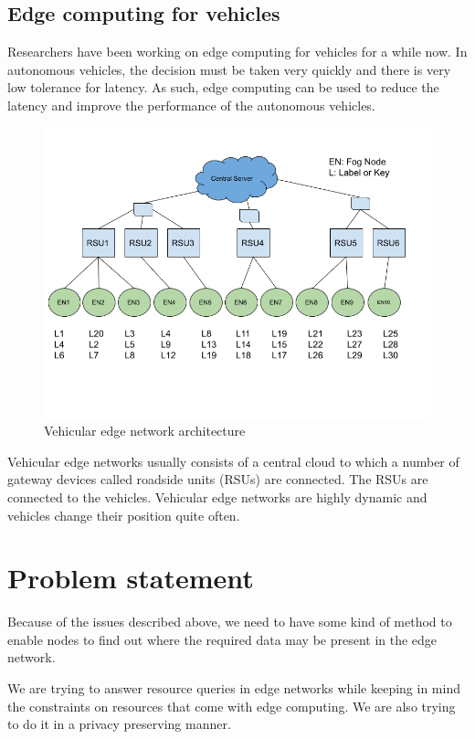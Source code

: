 \subsection{Edge computing for vehicles}

Researchers have been working on edge computing for vehicles for a while now. In
autonomous vehicles, the decision must be taken very quickly and there is very
low tolerance for latency. As such, edge computing can be used to reduce the
latency and improve the performance of the autonomous vehicles.

\begin{figure}[h]
      \centering
      \includegraphics[width=1.0\textwidth]{"Vehicular Edge Network.png"}
      \caption{Vehicular edge network architecture}
\end{figure}

Vehicular edge networks usually consists of a central cloud to which a number of
gateway devices called roadside units (RSUs) are connected. The RSUs are
connected to the vehicles. Vehicular edge networks are highly dynamic and
vehicles change their position quite often.


\section{Problem statement}

Because of the issues described above, we need to have some kind of method to
enable nodes to find out where the required data may be present in the edge
network.

We are trying to answer resource queries in edge networks while keeping in mind
the constraints on resources that come with edge computing. We are also trying
to do it in a privacy preserving manner.

